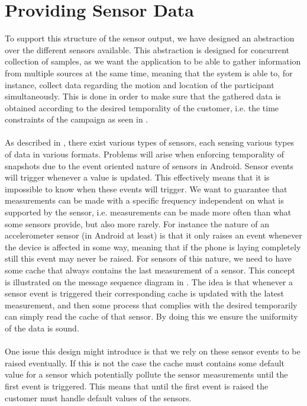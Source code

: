 
\section{Providing Sensor Data}
\label{sec:providing_sensor_data}

To support this structure of the sensor output, we have designed an abstraction over the different sensors available. This abstraction is designed for concurrent collection of samples, as we want the application to be able to gather information from multiple sources at the same time, meaning that the system is able to, for instance, collect data regarding the motion and location of the participant simultaneously. This is done in order to make sure that the gathered data is obtained according to the desired temporality of the customer, i.e. the time constraints of the campaign as seen in .
\\\\
As described in , there exist various types of sensors, each sensing various types of data in various formats. Problems will arise when enforcing temporality of snapshots due to the event oriented nature of sensors in Android. Sensor events will trigger whenever a value is updated. This effectively means that it is impossible to know when these events will trigger. We want to guarantee that measurements can be made with a specific frequency independent on what is supported by the sensor, i.e. measurements can be made more often than what some sensors provide, but also more rarely. For instance the nature of an accelerometer sensor (in Android at least) is that it only raises an event whenever the device is affected in some way, meaning that if the phone is laying completely still this event may never be raised. For sensors of this nature, we need to have some cache that always contains the last measurement of a sensor. This concept is illustrated on the message sequence diagram in . The idea is that whenever a sensor event is triggered their corresponding cache is updated with the latest measurement, and then some process that complies with the desired temporarily can simply read the cache of that sensor. By doing this we ensure the uniformity of the data is sound. 
\\\\
One issue this design might introduce is that we rely on these sensor events to be raised eventually. If this is not the case the cache must contains some default value for a sensor which potentially pollute the sensor measurements until the first event is triggered. This means that until the first event is raised the customer must handle default values of the sensors. 

